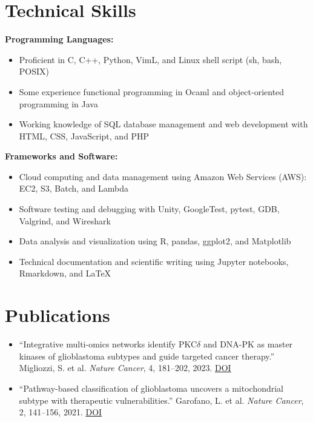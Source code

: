 \documentclass[11pt,a4paper]{article}   %
\begin{document}
\section*{Technical Skills}
\textbf{Programming Languages:}
\begin{itemize}[noitemsep, topsep=2pt, partopsep=0pt, parsep=0pt]
  \item Proficient in C, C++, Python, VimL, and Linux shell script (sh, bash, POSIX)
  \item Some experience functional programming in Ocaml and object-oriented programming in Java
  \item Working knowledge of SQL database management and web development with HTML, CSS, JavaScript, and PHP
\end{itemize}

\vspace{0.1cm}
\textbf{Frameworks and Software:}
\begin{itemize}[noitemsep, topsep=2pt, partopsep=0pt, parsep=0pt]
  \item Cloud computing and data management using Amazon Web Services (AWS): EC2, S3, Batch, and Lambda
  \item Software testing and debugging with Unity, GoogleTest, pytest, GDB, Valgrind, and Wireshark
  \item Data analysis and visualization using R, pandas, ggplot2, and Matplotlib
  \item Technical documentation and scientific writing using Jupyter notebooks, Rmarkdown, and \LaTeX
\end{itemize}

\section*{Publications}
\begin{itemize}[noitemsep, topsep=2pt, partopsep=0pt, parsep=0pt]
  \item ``Integrative multi-omics networks identify PKC$\delta$ and DNA-PK as master kinases of glioblastoma subtypes and guide targeted cancer therapy.'' Migliozzi, S. et al. \textit{Nature Cancer}, 4, 181–202, 2023. \href{https://doi.org/10.1038/s43018-022-00510-x}{DOI}
  \item ``Pathway-based classification of glioblastoma uncovers a mitochondrial subtype with therapeutic vulnerabilities.'' Garofano, L. et al. \textit{Nature Cancer}, 2, 141–156, 2021. \href{https://doi.org/10.1038/s43018-020-00159-4}{DOI}
\end{itemize}
\end{document}
